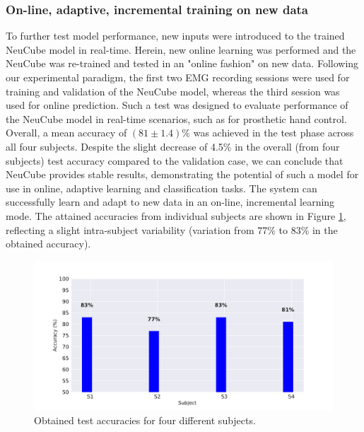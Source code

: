 \documentclass[journal,article,submit,moreauthors,pdftex,10pt,a4paper]{Definitions/mdpi}
\begin{document}
\subsubsection{On-line, adaptive, incremental training on new data}
To further test model performance, new inputs were introduced to the trained NeuCube model in real-time. Herein, new online learning was performed and the NeuCube was re-trained and tested in an "online fashion" on new data. Following our experimental paradigm, the first two EMG recording sessions were used for training and validation of the NeuCube model, whereas the third session was used for online prediction. Such a test was designed to evaluate performance of the NeuCube model in real-time scenarios, such as for prosthetic hand control. Overall, a mean accuracy of  $(81\pm 1.4)\%$  was achieved in the test phase across all four subjects. Despite the slight decrease of 4.5\% in the overall (from four subjects) test accuracy compared to the validation case, we can conclude that NeuCube provides stable results, demonstrating the potential of such a model for use in online, adaptive learning and classification tasks. The system can successfully learn and adapt to new data in an on-line, incremental learning mode. The attained accuracies from individual subjects are shown in Figure \ref{FIG:xx.pdf}, reflecting a slight intra-subject variability (variation from 77\% to 83\% in the obtained accuracy). 
\begin{figure}[ht]
    \centering
    \includegraphics [width=0.85\linewidth]{xx.pdf}
    \caption{Obtained test accuracies for four different subjects. 
}
    \label{FIG:xx.pdf}
\end{figure}
\end{document}
